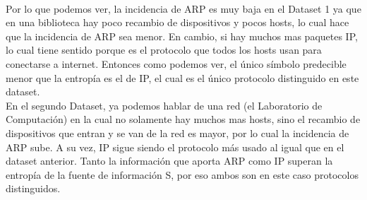  \\


Por lo que podemos ver, la incidencia de ARP es muy baja en el Dataset 1 ya que en una biblioteca hay poco recambio de dispositivos y pocos hosts, lo cual hace que la incidencia de ARP sea menor. En cambio, si hay muchos mas paquetes IP, lo cual tiene sentido porque es el protocolo que todos los hosts usan para conectarse a internet. Entonces como podemos ver, el único símbolo predecible menor que la entropía es el de IP, el cual es el único protocolo distinguido en este dataset. \\

En el segundo Dataset, ya podemos hablar de una red (el Laboratorio de Computación) en la cual no solamente hay muchos mas hosts, sino el recambio de dispositivos que entran y se van de la red es mayor, por lo cual la incidencia de ARP sube. A su vez, IP sigue siendo el protocolo más usado al igual que en el dataset anterior. Tanto la información que aporta ARP como IP superan la entropía de la fuente de información S, por eso ambos son en este caso protocolos distinguidos. \\

